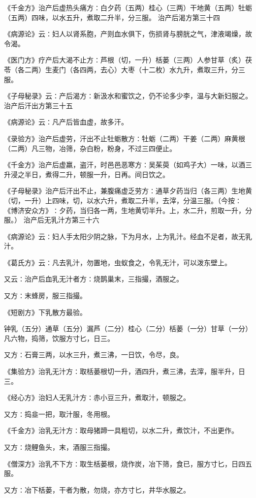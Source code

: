 \documentclass[a4paper,12pt,UTF8,twoside]{ctexbook}
\begin{document}
《千金方》治产后虚热头痛方∶白夕药（五两）桂心（三两）干地黄（五两）牡蛎（五两）四味，以水五升，煮取二升半，分三服。
治产后渴方第三十四

《病源论》云∶妇人以肾系胞，产则血水俱下，伤损肾与膀胱之气，津液竭燥，故令渴。

《医门方》疗产后大渴不止方∶芦根（切，一升）栝蒌（三两）人参甘草（炙）茯苓（各二两）生麦门（各四两，去心）大枣（十二枚）水九升，煮取三升，分三服。

《子母秘录》云∶产后渴方∶新汲水和蜜饮之，仍不论多少李，温与大新妇服之。
治产后汗出方第三十五

《病源论》云∶凡产后皆血虚，故多汗。

《录验方》治产后虚劳，汗出不止牡蛎散方∶牡蛎（二两）干姜（二两）麻黄根（二两）凡三物，冶筛，杂白粉，粉身，不过三四便止。

《千金方》治产后虚羸，盗汗，时邑邑恶寒方∶吴茱萸（如鸡子大）一味，以酒三升浸之半日，煮得二升，顿服一升，日再。间日饮之。

《子母秘录》治产后汗出不止，兼腹痛虚乏劳方∶通草夕药当归（各三两）生地黄（切，一升）上四味，切，以水六升，煮取二升半，去滓，分温三服。（今按∶《博济安众方》∶夕药，当归各一两，生地黄切半升。上，水二升，煎取一升，分服。）
治产后无乳汁方第三十六

《病源论》云∶妇人手太阳少阴之脉，下为月水，上为乳汁。经血不足者，故无乳汁。

《葛氏方》云∶凡去乳汁，勿置地，虫蚁食之，令乳无汁，可以泼东壁上。

又云∶治产后血乳无汁者方∶烧鹊巢末，三指撮，酒服之。

又方∶末蜂房，服三指撮。

《短剧方》下乳散方最验。

钟乳（五分）通草（五分）漏芦（二分）桂心（二分）栝蒌（一分）甘草（一分）凡六物，捣筛，饮服方寸匕，日三。

又方∶石膏三两，以水三升，煮三沸，一日饮，令尽，良。

《集验方》治乳无汁方∶取栝蒌根切一升，酒四升，煮三沸，去滓，服半升，日三。

《经心方》治妇人无乳汁方∶赤小豆三升，煮取汁，顿服之。

又方∶捣韭一把，取汁服，冬用根。

《千金方》治乳无汁方∶取母猪蹄一具粗切，以水二升，煮饮汁，不出更作。

又方∶烧鲤鱼头，末，酒服三指撮。

《僧深方》治乳不下方∶取生栝蒌根，烧作炭，冶下筛，食已，服方寸匕，日四五服。

又方∶冶下栝蒌，干者为散，勿烧，亦方寸匕，井华水服之。
\end{document}
